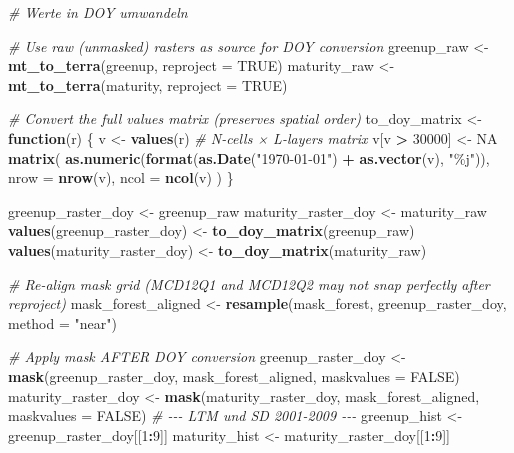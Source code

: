 \documentclass[
]{article}
\newenvironment{Shaded}{\begin{snugshade}}{\end{snugshade}}
\newcommand{\AttributeTok}[1]{\textcolor[rgb]{0.13,0.29,0.53}{#1}}
\newcommand{\CommentTok}[1]{\textcolor[rgb]{0.56,0.35,0.01}{\textit{#1}}}
\newcommand{\ConstantTok}[1]{\textcolor[rgb]{0.56,0.35,0.01}{#1}}
\newcommand{\ControlFlowTok}[1]{\textcolor[rgb]{0.13,0.29,0.53}{\textbf{#1}}}
\newcommand{\DecValTok}[1]{\textcolor[rgb]{0.00,0.00,0.81}{#1}}
\newcommand{\FunctionTok}[1]{\textcolor[rgb]{0.13,0.29,0.53}{\textbf{#1}}}
\newcommand{\NormalTok}[1]{#1}
\newcommand{\OtherTok}[1]{\textcolor[rgb]{0.56,0.35,0.01}{#1}}
\newcommand{\SpecialCharTok}[1]{\textcolor[rgb]{0.81,0.36,0.00}{\textbf{#1}}}
\newcommand{\StringTok}[1]{\textcolor[rgb]{0.31,0.60,0.02}{#1}}
\begin{document}
\begin{Shaded}
\begin{Highlighting}[]
\CommentTok{\# Werte in DOY umwandeln}

\CommentTok{\# Use raw (unmasked) rasters as source for DOY conversion}
\NormalTok{greenup\_raw  }\OtherTok{\textless{}{-}} \FunctionTok{mt\_to\_terra}\NormalTok{(greenup,   }\AttributeTok{reproject =} \ConstantTok{TRUE}\NormalTok{)}
\NormalTok{maturity\_raw }\OtherTok{\textless{}{-}} \FunctionTok{mt\_to\_terra}\NormalTok{(maturity,  }\AttributeTok{reproject =} \ConstantTok{TRUE}\NormalTok{)}

\CommentTok{\# Convert the full values matrix (preserves spatial order)}
\NormalTok{to\_doy\_matrix }\OtherTok{\textless{}{-}} \ControlFlowTok{function}\NormalTok{(r) \{}
\NormalTok{  v }\OtherTok{\textless{}{-}} \FunctionTok{values}\NormalTok{(r)                         }\CommentTok{\# N{-}cells × L{-}layers matrix}
\NormalTok{  v[v }\SpecialCharTok{\textgreater{}} \DecValTok{30000}\NormalTok{] }\OtherTok{\textless{}{-}} \ConstantTok{NA}
  \FunctionTok{matrix}\NormalTok{(}
    \FunctionTok{as.numeric}\NormalTok{(}\FunctionTok{format}\NormalTok{(}\FunctionTok{as.Date}\NormalTok{(}\StringTok{"1970{-}01{-}01"}\NormalTok{) }\SpecialCharTok{+} \FunctionTok{as.vector}\NormalTok{(v), }\StringTok{"\%j"}\NormalTok{)),}
    \AttributeTok{nrow =} \FunctionTok{nrow}\NormalTok{(v), }\AttributeTok{ncol =} \FunctionTok{ncol}\NormalTok{(v)}
\NormalTok{  )}
\NormalTok{\}}

\NormalTok{greenup\_raster\_doy  }\OtherTok{\textless{}{-}}\NormalTok{ greenup\_raw}
\NormalTok{maturity\_raster\_doy }\OtherTok{\textless{}{-}}\NormalTok{ maturity\_raw}
\FunctionTok{values}\NormalTok{(greenup\_raster\_doy)  }\OtherTok{\textless{}{-}} \FunctionTok{to\_doy\_matrix}\NormalTok{(greenup\_raw)}
\FunctionTok{values}\NormalTok{(maturity\_raster\_doy) }\OtherTok{\textless{}{-}} \FunctionTok{to\_doy\_matrix}\NormalTok{(maturity\_raw)}

\CommentTok{\# Re{-}align mask grid (MCD12Q1 and MCD12Q2 may not snap perfectly after reproject)}
\NormalTok{mask\_forest\_aligned }\OtherTok{\textless{}{-}} \FunctionTok{resample}\NormalTok{(mask\_forest, greenup\_raster\_doy, }\AttributeTok{method =} \StringTok{"near"}\NormalTok{)}

\CommentTok{\# Apply mask AFTER DOY conversion}
\NormalTok{greenup\_raster\_doy  }\OtherTok{\textless{}{-}} \FunctionTok{mask}\NormalTok{(greenup\_raster\_doy,  mask\_forest\_aligned, }\AttributeTok{maskvalues =} \ConstantTok{FALSE}\NormalTok{)}
\NormalTok{maturity\_raster\_doy }\OtherTok{\textless{}{-}} \FunctionTok{mask}\NormalTok{(maturity\_raster\_doy, mask\_forest\_aligned, }\AttributeTok{maskvalues =} \ConstantTok{FALSE}\NormalTok{)}
\CommentTok{\# {-}{-}{-} LTM und SD 2001{-}2009 {-}{-}{-}}
\NormalTok{greenup\_hist }\OtherTok{\textless{}{-}}\NormalTok{ greenup\_raster\_doy[[}\DecValTok{1}\SpecialCharTok{:}\DecValTok{9}\NormalTok{]]}
\NormalTok{maturity\_hist }\OtherTok{\textless{}{-}}\NormalTok{ maturity\_raster\_doy[[}\DecValTok{1}\SpecialCharTok{:}\DecValTok{9}\NormalTok{]]}


\end{Highlighting}
\end{Shaded}
\end{document}

